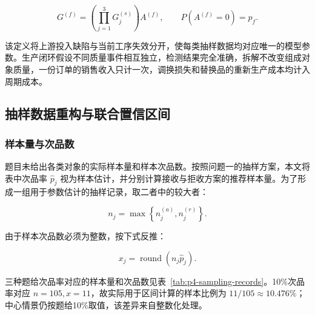 \documentclass{cumcm}
\numberwithin{figure}{section}
\numberwithin{table}{section}
\begin{document}
\[
G^{(f)}=
\left(\prod_{j=1}^{3}G_j^{(s)}\right)A^{(f)},
\qquad
P\left(A^{(f)}=0\right)=p_f.
\]

该定义将上游投入缺陷与当前工序失效分开，使每类抽样数据均对应唯一的模型参数。生产闭环假设不同质量事件相互独立，检测结果完全准确，拆解不改变组成对象质量，一份订单的销售收入只计一次，调换损失和替换品的重新生产成本均计入周期成本。

\subsection{抽样数据重构与联合置信区间}\label{ux62bdux6837ux6570ux636eux91cdux6784ux4e0eux8054ux5408ux7f6eux4fe1ux533aux95f4}

\subsubsection{样本量与次品数}\label{ux6837ux672cux91cfux4e0eux6b21ux54c1ux6570}

题目未给出各类对象的实际样本量和样本次品数。按照问题一的抽样方案，本文将表中次品率 \(\hat p_j\) 视为样本估计，并分别计算接收与拒收方案的推荐样本量。为了形成一组用于参数估计的抽样记录，取二者中的较大者：

\[
n_j=\max\left\{n_j^{(a)},n_j^{(r)}\right\}.
\]

由于样本次品数必须为整数，按下式反推：

\[
x_j=\operatorname{round}(n_j\hat p_j).
\]

三种题给次品率对应的样本量和次品数见表~\ref{tab:p4-sampling-records}。10\%次品率对应 \(n=105,x=11\)，故实际用于区间计算的样本比例为 \(11/105\approx10.476\%\)；中心情景仍按题给10\%取值，该差异来自整数化处理。
\end{document}
